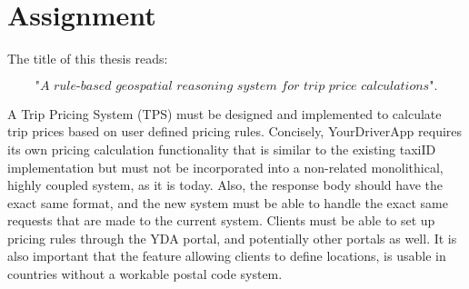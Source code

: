 %
\section{Assignment}
The title of this thesis reads:

\[\textit{"A rule-based geospatial reasoning system for trip price calculations"}.\] \hfill

A Trip Pricing System (TPS) must be designed and implemented to calculate trip prices based on user defined pricing rules. Concisely, YourDriverApp requires its own pricing calculation functionality that is similar to the existing taxiID implementation but must not be incorporated into a non-related monolithical, highly coupled system, as it is today. Also, the response body should have the exact same format, and the new system must be able to handle the exact same requests that are made to the current system. Clients must be able to set up pricing rules through the YDA portal, and potentially other portals as well. It is also important that the feature allowing clients to define locations, is usable in countries without a workable postal code system.

%
